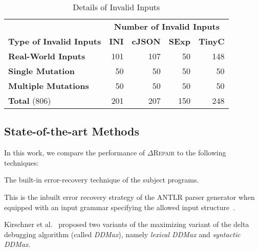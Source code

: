 \documentclass[acmsmall,screen,review,anonymous]{acmart}
\newcommand{\recheck}[1]{\textcolor{red}{#1}}
\newcommand{\approach}{\textsc{$\Delta$Repair}\xspace}
\newcommand{\ddmax}{\textit{DDMax}\xspace}
\begin{document}
\begin{table}[!tbp]\centering
\caption{Details of Invalid 
Inputs}
\begin{tabular}{|l | r | r | r | r |}
\hline
&  \multicolumn{4}{c|}{\textbf{Number of Invalid Inputs}}  \\
\textbf{Type of Invalid Inputs} & \textbf{INI} & \textbf{cJSON} & \textbf{SExp} & \textbf{TinyC} \\
\hline
\textbf{Real-World Inputs} & 101 & 107 & 50 & 148 \\
\textbf{Single Mutation} & 50 & 50 & 50 & 50 \\
\textbf{Multiple Mutations} & 50 & 50 & 50 & 50 \\
\hline
\textbf{Total } (806) & 201 & 207 & 150 & 248 \\
\hline
\end{tabular}
\label{tab:input-details}
\end{table}


\subsection{State-of-the-art Methods}
In this work, we compare the performance of \approach to the following
techniques:
\begin{description}[wide]
\item[\textbf{(1) Baseline:}] The built-in error-recovery technique of the subject programs.

\item[\textbf{(2) ANTLR:}] This is the inbuilt error recovery strategy of the ANTLR parser generator when equipped with an input grammar specifying the allowed input structure~\cite[Automatic Error Recovery Strategy]{parr2013definitive}.
\item[\textbf{(3) \ddmax:}] Kirschner et al.~\cite{kirschner2020debugging} proposed %
two variants of the maximizing variant of the delta debugging algorithm (called \ddmax), %
namely \textit{lexical \ddmax} and \textit{syntactic \ddmax}.
\end{description}
\end{document}
